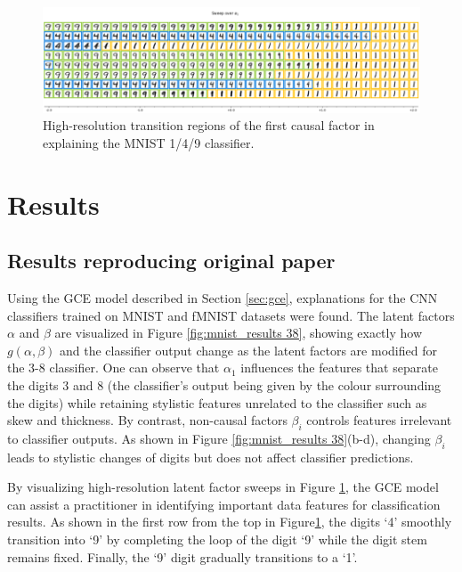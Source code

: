 
\begin{figure}[!htbp]
	\centering
	\includegraphics[width=\textwidth]{../openreview/pictures/mnist_149/alpha_1_149_high_reso.png}
	\caption{High-resolution transition regions of the first causal factor in explaining the MNIST 1/4/9 classifier.}
	\label{fig:high_resolution_149}
\end{figure}

\section{Results} \label{sec:results}
\subsection{Results reproducing original paper}

Using the GCE model described in Section \ref{sec:gce}, explanations for the CNN classifiers trained on MNIST and fMNIST datasets were found. The latent factors $\alpha$ and $\beta$ are visualized in Figure \ref{fig:mnist_results 38}, showing exactly how $g(\alpha, \beta)$ and the classifier output change as the latent factors are modified for the 3-8 classifier. One can observe that $\alpha_1$ influences the features that separate the digits 3 and 8 (the classifier's output being given by the colour surrounding the digits) while retaining stylistic features unrelated to the classifier such as skew and thickness. By contrast, non-causal factors ${\beta_i}$ controls features irrelevant to classifier outputs. As shown in Figure \ref{fig:mnist_results 38}(b-d), changing  ${\beta_i}$ leads to stylistic changes of digits but does not affect classifier predictions.

By visualizing high-resolution latent factor sweeps in Figure \ref{fig:high_resolution_149}, the GCE model can assist a practitioner in identifying important data features for classification results. As shown in the first row from the top in Figure\ref{fig:high_resolution_149}, the digits `4' smoothly transition into `9' by completing the loop of the digit `9’ while the digit stem remains fixed. Finally, the `9' digit gradually transitions to a `1'. 

